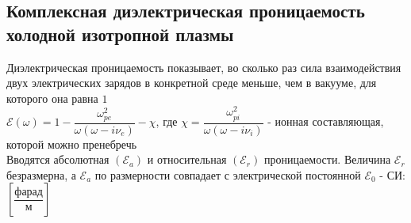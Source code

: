 \begin{multicols*}{2}
		\section{Комплексная диэлектрическая проницаемость холодной изотропной плазмы}
		Диэлектрическая проницаемость показывает, во сколько раз сила взаимодействия двух электрических зарядов в конкретной среде меньше, чем в вакууме, для которого она равна $1$\\
		$\mathcal{E} (\omega) = 1 - \dfrac{\omega_{pe}^2}{\omega(\omega - i\nu_e)} - \chi $, где $\chi = \dfrac{\omega_{pi}^2}{\omega(\omega - i\nu_i)}$ - ионная составляющая, которой можно пренебречь\\
		Вводятся абсолютная $(\mathcal{E}_a)$ и относительная $(\mathcal{E}_r)$ проницаемости. Величина $\mathcal{E} _{r}$ безразмерна, а ${\displaystyle \mathcal{E} _{a}}$ по размерности совпадает с электрической постоянной $\mathcal{E}_{0}$ - СИ: $\left[\dfrac{\text{фарад}}{\text{м}}\right]$


	\end{multicols*}


